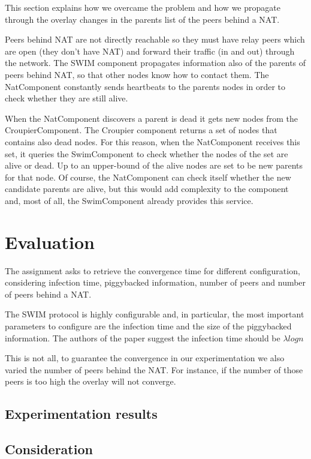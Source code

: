 \documentclass[10pt,a4paper]{article}
\begin{document}
This section explains how we overcame the problem and how we propagate through the overlay changes in the parents list of the peers behind a NAT.

Peers behind NAT are not directly reachable so they must have relay peers which are open (they don't have NAT) and forward their traffic (in and out) through the network. The SWIM component propagates information also of the parents of peers behind NAT, so that other nodes know how to contact them. The NatComponent constantly sends heartbeats to the parents nodes in order to check whether they are still alive.

When the NatComponent discovers a parent is dead it gets new nodes from the CroupierComponent. The Croupier component returns a set of nodes that contains also dead nodes. For this reason, when the NatComponent receives this set, it queries the SwimComponent to check whether the nodes of the set are alive or dead. Up to an upper-bound of the alive nodes are set to be new parents for that node. Of course, the NatComponent can check itself whether the new candidate parents are alive, but this would add complexity to the component and, most of all, the SwimComponent already provides this service.

\section{Evaluation}

The assignment asks to retrieve the convergence time for different configuration, considering infection time, piggybacked information, number of peers and number of peers behind a NAT.

The SWIM protocol is highly configurable and, in particular, the most important parameters to configure are the infection time and the size of the piggybacked information. The authors of the paper suggest the infection time should be $\lambda logn$

This is not all, to guarantee the convergence in our experimentation we also varied the number of peers behind the NAT. For instance, if the number of those peers is too high the overlay will not converge.

\subsection{Experimentation results}

\subsection{Consideration}
\end{document}

